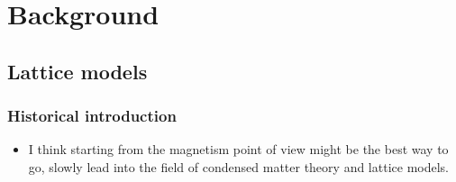 
\chapter{Background}
\label{chapter2}

\ifpdf
    \graphicspath{{Chapter2/Figs/Raster/}{Chapter2/Figs/PDF/}{Chapter2/Figs/}}
\else
    \graphicspath{{Chapter2/Figs/Vector/}{Chapter2/Figs/}}
\fi

\section{Lattice models}
\label{sec:lattice-models}

\subsection{Historical introduction}
\label{subsec:latt-hist}
\begin{itemize}
	\item I think starting from the magnetism point of view might be the best way to go, slowly lead into the field of condensed matter theory and lattice models. 
\end{itemize}


